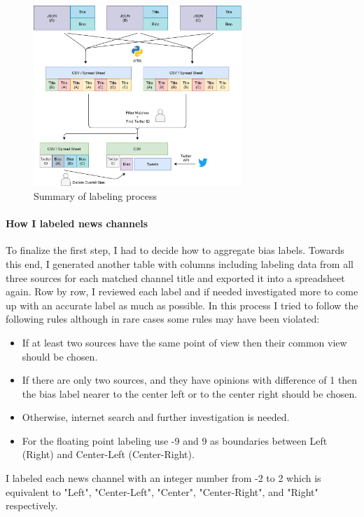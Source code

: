 \documentclass[11pt]{article}
\begin{document}
\begin{figure}
  \centering
  \includegraphics[width=0.7\textwidth]{figs/nlp_phase_1_summary.png}
  \caption{Summary of labeling process}
\end{figure}

\paragraph{How I labeled news channels}
To finalize the first step, I had to decide how to aggregate bias labels. Towards this end, I generated another table with columns including labeling data from all three sources for each matched channel title and exported it into a spreadsheet again. Row by row, I reviewed each label and if needed investigated more to come up with an accurate label as much as possible. In this process I tried to follow the following rules although in rare cases some rules may have been violated:
\begin{itemize}
  \item If at least two sources have the same point of view then their common view should be chosen.
  \item If there are only two sources, and they have opinions with difference of 1 then the bias label nearer to the center left or to the center right should be chosen.
  \item Otherwise, internet search and further investigation is needed.
  \item For the floating point labeling use -9 and 9 as boundaries between Left (Right) and Center-Left (Center-Right).
\end{itemize}
I labeled each news channel with an integer number from -2 to 2 which is equivalent to "Left", "Center-Left", "Center", "Center-Right", and "Right" respectively.
\end{document}
